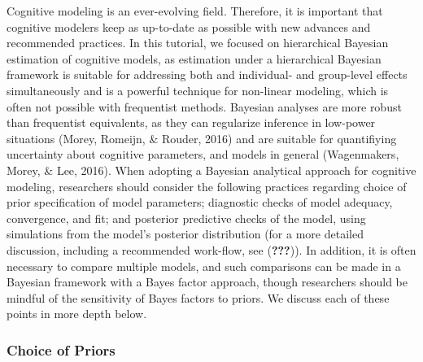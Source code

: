 \documentclass[
  english,
  ,man,floatsintext]{apa6}
\begin{document}
Cognitive modeling is an ever-evolving field. Therefore, it is important that cognitive modelers keep as up-to-date as possible with new advances and recommended practices. In this tutorial, we focused on hierarchical Bayesian estimation of cognitive models, as estimation under a hierarchical Bayesian framework is suitable for addressing both and individual- and group-level effects simultaneously and is a powerful technique for non-linear modeling, which is often not possible with frequentist methods. Bayesian analyses are more robust than frequentist equivalents, as they can regularize inference in low-power situations (Morey, Romeijn, \& Rouder, 2016) and are suitable for quantifiying uncertainty about cognitive parameters, and models in general (Wagenmakers, Morey, \& Lee, 2016). When adopting a Bayesian analytical approach for cognitive modeling, researchers should consider the following practices regarding choice of prior specification of model parameters; diagnostic checks of model adequacy, convergence, and fit; and posterior predictive checks of the model, using simulations from the model's posterior distribution (for a more detailed discussion, including a recommended work-flow, see ({\textbf{???}})). In addition, it is often necessary to compare multiple models, and such comparisons can be made in a Bayesian framework with a Bayes factor approach, though researchers should be mindful of the sensitivity of Bayes factors to priors. We discuss each of these points in more depth below.

\hypertarget{choice-of-priors}{%
\subsubsection{Choice of Priors}\label{choice-of-priors}}
\end{document}
